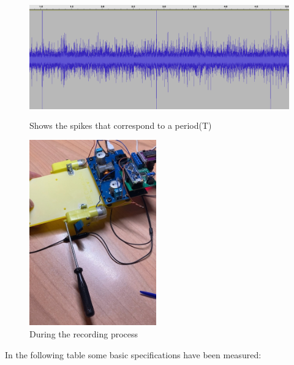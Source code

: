 \documentclass[a4paper]{article}
\begin{document}
\begin{figure}[H]
\begin{Center}
\advance\leftskip 0.23in		
    \includegraphics[width=5.06in,height=2.02in]{./media/image2.png}
	\caption{Shows the spikes that correspond to a period(T)}
		\label{Shows the spikes that correspond to a period(T)}
\end{Center}
\end{figure}







\begin{figure}[H]
	\begin{Center}
		\includegraphics[width=2.16in,height=3.15in]{./media/image1.jpeg}
		\caption{During the recording process}
		\label{figDuring_the_process_of_recording}
	\end{Center}
\end{figure}



In the following table some basic specifications have been measured:
\end{document}

